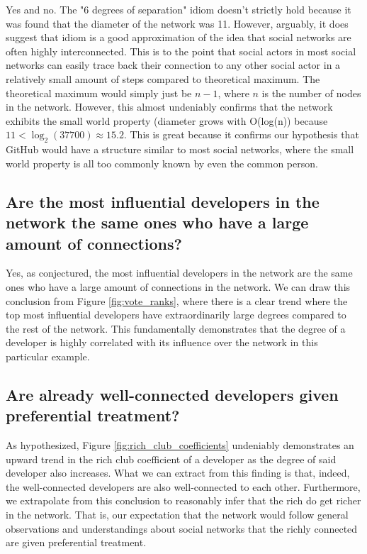 \documentclass[9pt,twocolumn,twoside]{pnas-new}
\begin{document}
Yes and no. The "6 degrees of separation" idiom doesn't strictly hold because it was found that the diameter of the network was 11. However, arguably, it does suggest that idiom is a good approximation of the idea that social networks are often highly interconnected. This is to the point that social actors in most social networks can easily trace back their connection to any other social actor in a relatively small amount of steps compared to theoretical maximum. The theoretical maximum would simply just be $n-1$, where $n$ is the number of nodes in the network. However, this almost undeniably confirms that the network exhibits the small world property (diameter grows with O(log(n)) because $11 < \log_{2}\left(37700\right) \approx 15.2$. This is great because it confirms our hypothesis that GitHub would have a structure similar to most social networks, where the small world property is all too commonly known by even the common person.

\subsection{Are the most influential developers in the network the same ones who have a large amount of connections?}

Yes, as conjectured, the most influential developers in the network are the same ones who have a large amount of connections in the network. We can draw this conclusion from Figure \ref{fig:vote_ranks}, where there is a clear trend where the top most influential developers have extraordinarily large degrees compared to the rest of the network. This fundamentally demonstrates that the degree of a developer is highly correlated with its influence over the network in this particular example.

\subsection{Are already well-connected developers given preferential treatment?}

As hypothesized, Figure \ref{fig:rich_club_coefficients} undeniably demonstrates an upward trend in the rich club coefficient of a developer as the degree of said developer also increases. What we can extract from this finding is that, indeed, the well-connected developers are also well-connected to each other. Furthermore, we extrapolate from this conclusion to reasonably infer that the rich do get richer in the network. That is, our expectation that the network would follow general observations and understandings about social networks that the richly connected are given preferential treatment.
\end{document}

